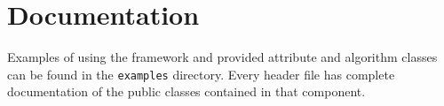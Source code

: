 \section{Documentation}

Examples of using the framework and provided attribute and algorithm
classes can be found in the \texttt{examples} directory. Every header
file has complete documentation of the public classes contained in
that component.

